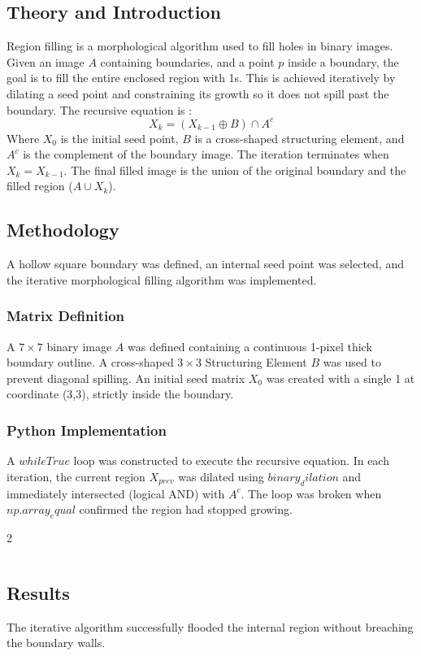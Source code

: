 \documentclass[11pt]{article}
\begin{document}
\subsection{Theory and Introduction}
Region filling is a morphological algorithm used to fill holes in binary images. Given an image $A$ containing boundaries, and a point $p$ inside a boundary, the goal is to fill the entire enclosed region with 1s. This is achieved iteratively by dilating a seed point and constraining its growth so it does not spill past the boundary. The recursive equation is \cite{gonzalez2018}:
$$
    X_k = (X_{k-1} \oplus B) \cap A^c
$$
Where $X_0$ is the initial seed point, $B$ is a cross-shaped structuring element, and $A^c$ is the complement of the boundary image. The iteration terminates when $X_k = X_{k-1}$. The final filled image is the union of the original boundary and the filled region ($A \cup X_k$).

\subsection{Methodology}
A hollow square boundary was defined, an internal seed point was selected, and the iterative morphological filling algorithm was implemented.

\subsubsection{Matrix Definition}
A $7 \times 7$ binary image $A$ was defined containing a continuous 1-pixel thick boundary outline. A cross-shaped $3 \times 3$ Structuring Element $B$ was used to prevent diagonal spilling. An initial seed matrix $X_0$ was created with a single 1 at coordinate (3,3), strictly inside the boundary.

\subsubsection{Python Implementation}
A $while True$ loop was constructed to execute the recursive equation. In each iteration, the current region $X_{prev}$ was dilated using $binary_dilation$ and immediately intersected (logical AND) with $A^c$. The loop was broken when $np.array_equal$ confirmed the region had stopped growing.

\begin{multicols}{2}
    \inputminted{python3}{./assets/lab11.py}
\end{multicols}

\subsection{Results}
The iterative algorithm successfully flooded the internal region without breaching the boundary walls.
\end{document}
